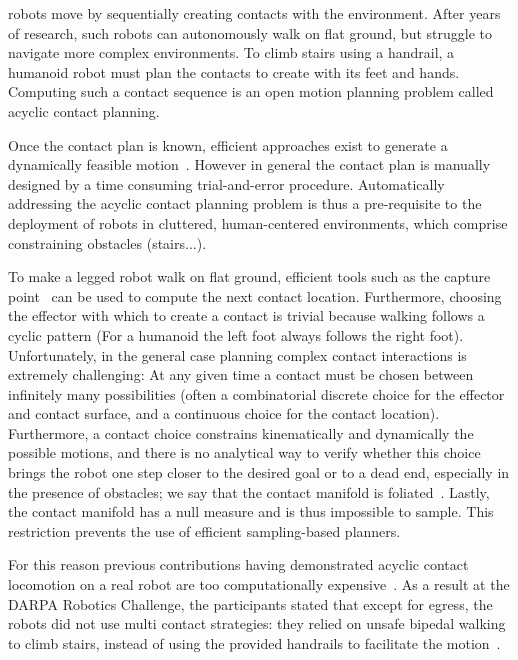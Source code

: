 \newcommand{\Pa}{$\mathcal{P}_1$ }
\newcommand{\Pb}{$\mathcal{P}_2$ }

 robots move by sequentially creating contacts with the environment.
After years of research, such robots can autonomously walk on flat ground, but struggle to navigate more complex environments.
To climb stairs using a handrail, a humanoid robot must plan the contacts to create with its feet and hands. Computing such a contact sequence is an open motion planning problem called acyclic contact planning.

Once the contact plan is known, efficient approaches exist to generate a dynamically feasible motion~\citep{Carpentier2016}. However in general
the contact plan is manually designed by a time consuming trial-and-error procedure. Automatically addressing the acyclic contact planning problem is thus a pre-requisite to the deployment of robots in cluttered, human-centered environments, which comprise constraining obstacles (stairs...).

To make a legged robot walk on flat ground, efficient tools such as the capture point~\citep{Pratt2006} can be used to compute the next contact location. Furthermore, choosing the effector with which to create a contact is trivial because walking follows a cyclic pattern (For a humanoid the left foot always follows the right foot).
Unfortunately, in the general case planning complex contact interactions is extremely challenging:
At any given time a contact must be chosen between infinitely many possibilities (often a combinatorial discrete choice for the effector and contact surface, and a continuous choice for the contact location). Furthermore, a contact choice constrains kinematically and dynamically the possible motions, and there is no analytical way to verify whether this choice brings the robot one step closer to the desired goal or to a dead end, especially in the presence of obstacles; we say that the contact manifold is foliated~\citep{simeon-manipulation-04}. Lastly, the contact manifold has a null measure and is thus impossible to sample. This restriction prevents the use of efficient sampling-based planners.


For this reason previous contributions having demonstrated acyclic contact locomotion on a real robot are too computationally expensive~\citep{Bretl:2006:MPM:1124573.1124585}. As a result at the DARPA Robotics Challenge, the participants stated that except for egress, the robots did not use multi contact strategies: they relied on unsafe bipedal walking to climb stairs, instead of using the provided handrails to facilitate the motion~\citep{atkensondarpa}. 

